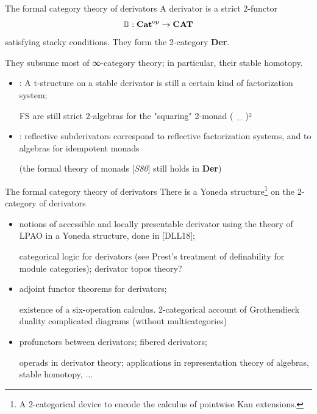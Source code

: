 \documentclass[handout]{beamer}
\def\lnk#1{\href{#1}{\faFilePdfO}}
\begin{document}
\begin{frame}{The formal category theory of derivators}
  A \alert{derivator} is a strict 2-functor
  \[\mathbb{D} : {\bf Cat}^\text{op} \to {\bf CAT} \]
  satisfying stacky conditions. They form the 2-category \textbf{Der}.

  They subsume most of ∞-category theory; in particular, their stable homotopy.
  \begin{itemize}
    \item<2-> [{[\alert{LV17}\lnk{https://www.sciencedirect.com/science/article/abs/pii/S0021869320300296}]}] : A t-structure on a stable derivator is still a certain kind of factorization system; 
    
    {\footnotesize\color{gray!40} FS are still \alert{strict 2-algebras} for the "squaring" 2-monad ( \_ )²}%

    \item<3->  [{[\alert{Lor18}\lnk{https://arxiv.org/abs/1802.08193}]}] : reflective subderivators correspond to reflective factorization systems, and to algebras for idempotent monads

    {\footnotesize\color{gray!40} (the \alert{formal theory of monads} [\emph{S80}] still holds in \textbf{Der})}%
  \end{itemize}
\end{frame}
%
\begin{frame}{The formal category theory of derivators}
  There is a \alert{Yoneda structure}\footnote{A 2-categorical device to encode the calculus of pointwise Kan extensions.} on the 2-category of derivators
\begin{itemize}
\item<2-> notions of \alert{accessible} and \alert{locally presentable} derivator using the theory of LPAO in a Yoneda structure, done in [\alert{DLL18}\lnk{https://arxiv.org/abs/1804.08710}]; 

{\footnotesize\color{gray!60} categorical logic for derivators (see Prest's treatment of \alert{definability} for module categories); derivator \alert{topos theory}?}
\item<3-> \alert{adjoint functor theorem}s for derivators; 

{\footnotesize\color{gray!60} existence of a \alert{six-operation} calculus. 2-categorical account of Grothendieck duality complicated diagrams (without multicategories)}
\item<4-> \alert{profunctors} between derivators; fibered derivators; 

{\footnotesize\color{gray!60} \alert{operads} in derivator theory; applications in representation theory of algebras, stable homotopy, ...}
\end{itemize}
\end{frame}
\end{document}
